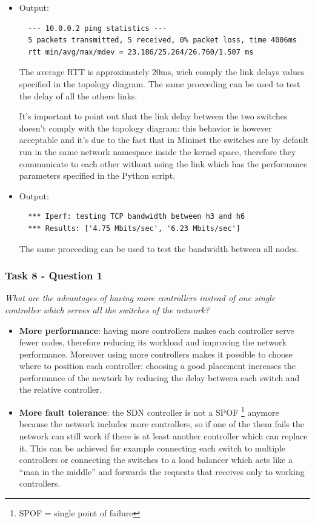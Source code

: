 \begin{itemize}
  \item {}

  Output:
  \begin{lstlisting}
  --- 10.0.0.2 ping statistics ---
  5 packets transmitted, 5 received, 0% packet loss, time 4006ms
  rtt min/avg/max/mdev = 23.186/25.264/26.760/1.507 ms
  \end{lstlisting}
  The average RTT is approximately 20ms, wich comply the link delays values
  specified in the topology diagram. The same proceeding can be used to test the
  delay of all the others links.

  It's important to point out that the link delay between the two switches doesn't
  comply with the topology diagram: this behavior is however acceptable and it's due to
  the fact that in Mininet the switches are by default run in the same network
  namespace inside the kernel space, therefore they communicate to each other
  without using the link which has the performance parameters specified
  in the Python script.

  \item {}

  Output:
  \begin{lstlisting}
  *** Iperf: testing TCP bandwidth between h3 and h6
  *** Results: ['4.75 Mbits/sec', '6.23 Mbits/sec']
  \end{lstlisting}

  The same proceeding can be used to test the bandwidth between all nodes.
\end{itemize}



\subsubsection*{Task 8 - Question 1}
\textit{What are the advantages of having more controllers instead of
one single controller which serves all the switches of the network?}
\begin{itemize}
  \item \textbf{More performance}:  having more controllers makes each controller serve fewer
  nodes, therefore reducing its workload and improving the network performance.
  Moreover using more controllers makes it possible to choose where to position
  each controller: choosing a good placement increases the performance
  of the newtork by reducing the delay between each switch and the relative
  controller.
  \item \textbf{More fault tolerance}: the SDN controller is not a SPOF \footnote{SPOF = single point of failure}
  anymore because the network includes more controllers, so if one of the them
  fails the network can still work if there is at least another controller which can replace it.
  This can be achieved for example connecting each switch to multiple controllers
  or connecting the switches to a load balancer which acts like a ``man in the middle'' and
  forwards the requests that receives only to working controllers.
\end{itemize}


